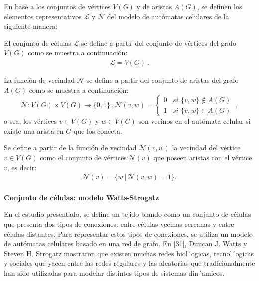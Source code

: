 \documentclass[a4paper,11pt]{article}
\begin{document}
{En base a los conjuntos de vértices $V(G)$ y de aristas $A(G)$, se definen los elementos representativos $\mathcal{L}$ y $\mathcal{N}$ del modelo de autómatas celulares de la siguiente manera:

El conjunto de c\'elulas $\mathcal{L}$ se define a partir del conjunto de v\'ertices del grafo $V(G)$ como se muestra a continuaci\'on: 
\begin{align}
\boxed{\mathcal{L} = V(G)}~. \label{eq-L}
\end{align}

La funci\'on de vecindad $\mathcal{N}$ se define a partir del conjunto de aristas del grafo $A(G)$ como se muestra a continuaci\'on:
\begin{subequations}
\begin{equation}
\boxed{\mathcal{N} : V(G) \times V(G) \rightarrow \lbrace 0,1 \rbrace}~, \label{eq-N}
\end{equation}
\begin{equation}
\boxed{\mathcal{N}(v,w) = \left\lbrace
	\begin{array}{lr}
		0& \textit{si } \lbrace v,w \rbrace \notin A(G)\\
		1& \textit{si } \lbrace v,w \rbrace \in A(G)
	\end{array}
\right.}~, \label{eq-N-2}
\end{equation}
\end{subequations}
o sea, los v\'ertices $v \in V(G)$ y $w \in V(G)$ son vecinos en el aut\'omata celular si existe una arista en $G$ que los conecta.

Se define a partir de la funci\'on de vecindad $\mathcal{N}(v,w)$ la vecindad del v\'ertice $v \in V(G)$ como el conjunto de v\'ertices $\mathcal{N}(v)$ que poseen aristas con el v\'ertice $v$, es decir:
\begin{align} 
\mathcal{N}(v) = \lbrace w~|~\mathcal{N}(v,w)=1 \rbrace. \label{eq-neighbourhood}
\end{align}
\\
\textbf{Conjunto de c\'elulas: modelo Watts-Strogatz}

En el estudio presentado, se define un tejido blando como un conjunto de células que presenta dos tipos de conexiones: entre células vecinas cercanas y entre células distantes. Para representar estos tipos de conexiones, se utiliza un modelo de autómatas celulares basado en una red de grafo. En [31],
Duncan J. Watts y Steven H. Strogatz mostraron que existen muchas redes biol´ogicas, tecnol´ogicas y sociales que yacen entre las redes regulares y las aleatorias que tradicionalmente han sido
utilizadas para modelar distintos tipos de sistemas din´amicos. 

}
\end{document}
